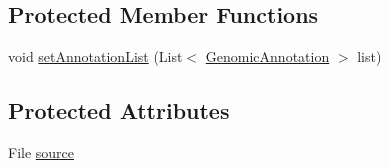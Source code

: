 \subsection*{Protected Member Functions}
\begin{DoxyCompactItemize}
\item 
void \hyperlink{classbroad_1_1core_1_1annotation_1_1_basic_genomic_annotation_reader_a2878e5be828b109b925585ef2a23ee0e}{set\+Annotation\+List} (List$<$ \hyperlink{interfacebroad_1_1core_1_1annotation_1_1_genomic_annotation}{Genomic\+Annotation} $>$ list)
\end{DoxyCompactItemize}
\subsection*{Protected Attributes}
\begin{DoxyCompactItemize}
\item 
File \hyperlink{classbroad_1_1core_1_1annotation_1_1_basic_genomic_annotation_reader_ab49a4ff8378bbaad2d520ac95b73601d}{source}
\end{DoxyCompactItemize}


